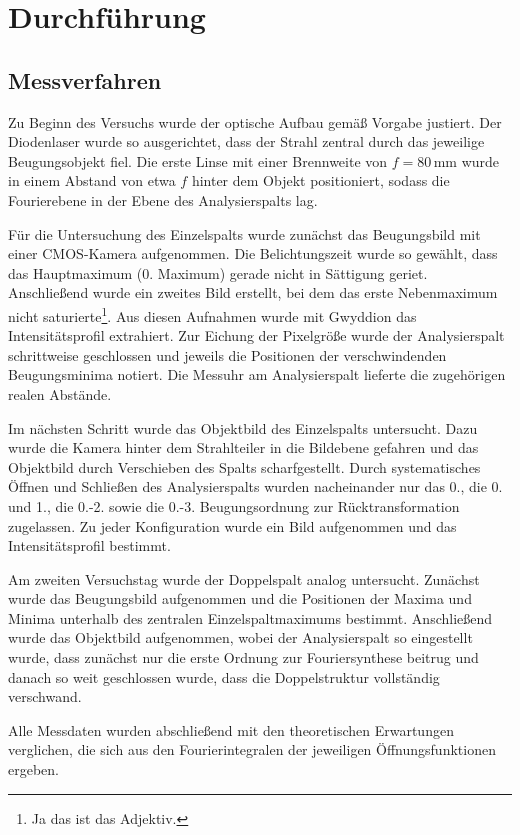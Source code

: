 \chapter{Durchführung} \label{ch:Durchfuehrung}

\section{Messverfahren} \label{sec:Messverfahren}

Zu Beginn des Versuchs wurde der optische Aufbau gemäß Vorgabe justiert. Der Diodenlaser wurde so ausgerichtet, dass der Strahl zentral durch das jeweilige Beugungsobjekt fiel. Die erste Linse mit einer Brennweite von \(f = 80\,\mathrm{mm}\) wurde in einem Abstand von etwa \(f\) hinter dem Objekt positioniert, sodass die Fourierebene in der Ebene des Analysierspalts lag.

Für die Untersuchung des Einzelspalts wurde zunächst das Beugungsbild mit einer CMOS-Kamera aufgenommen. Die Belichtungszeit wurde so gewählt, dass das Hauptmaximum (0. Maximum) gerade nicht in Sättigung geriet. Anschließend wurde ein zweites Bild erstellt, bei dem das erste Nebenmaximum nicht saturierte\footnote{Ja das ist das Adjektiv.}. Aus diesen Aufnahmen wurde mit Gwyddion das Intensitätsprofil extrahiert.  
Zur Eichung der Pixelgröße wurde der Analysierspalt schrittweise geschlossen und jeweils die Positionen der verschwindenden Beugungsminima notiert. Die Messuhr am Analysierspalt lieferte die zugehörigen realen Abstände.

Im nächsten Schritt wurde das Objektbild des Einzelspalts untersucht. Dazu wurde die Kamera hinter dem Strahlteiler in die Bildebene gefahren und das Objektbild durch Verschieben des Spalts scharfgestellt. Durch systematisches Öffnen und Schließen des Analysierspalts wurden nacheinander nur das 0., die 0. und 1., die 0.-2. sowie die 0.-3. Beugungsordnung zur Rücktransformation zugelassen. Zu jeder Konfiguration wurde ein Bild aufgenommen und das Intensitätsprofil bestimmt.

Am zweiten Versuchstag wurde der Doppelspalt analog untersucht. Zunächst wurde das Beugungsbild aufgenommen und die Positionen der Maxima und Minima unterhalb des zentralen Einzelspaltmaximums bestimmt. Anschließend wurde das Objektbild aufgenommen, wobei der Analysierspalt so eingestellt wurde, dass zunächst nur die erste Ordnung zur Fouriersynthese beitrug und danach so weit geschlossen wurde, dass die Doppelstruktur vollständig verschwand.

Alle Messdaten wurden abschließend mit den theoretischen Erwartungen verglichen, die sich aus den Fourierintegralen der jeweiligen Öffnungsfunktionen ergeben.

